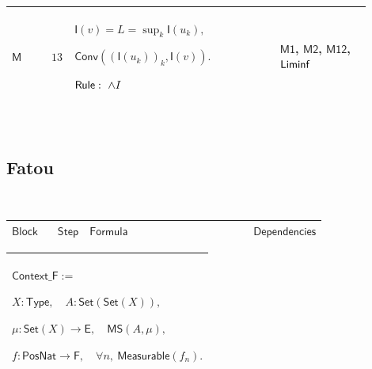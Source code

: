 \documentclass[12pt,reqno]{amsart}
\theoremstyle{blueplain}
\numberwithin{equation}{section}
\newlength{\FATOUOneColumnBody}
\begin{document}
{\scriptsize \setlength{\parskip}{0pt}\nointerlineskip
\noindent 
\begin{tabular}{|@{}>{\centering\arraybackslash}m{0.10658\linewidth}|>{\centering\arraybackslash}m{0.03553\linewidth}|>{\centering\arraybackslash}m{0.52105\linewidth}|>{\centering\arraybackslash}m{0.23684\linewidth}|}
\hline
\hypertarget{proof:M13}{$\displaystyle \mathsf{M}$} & $\displaystyle 13$ & $%
\displaystyle \mathsf{I}(v)=L=\sup_k\mathsf{I}(u_k),$\par$\displaystyle 
\mathsf{Conv}((\mathsf{I}(u_k))_k,\mathsf{I}(v)).$\par$\displaystyle \mathsf{%
Rule}:\ \land I$ & \hyperlink{proof:M1}{$\displaystyle \mathsf{M1}$}, 
\hyperlink{proof:M2}{$\displaystyle \mathsf{M2}$}, \hyperlink{proof:M12}{$%
\displaystyle \mathsf{M12}$}, \hyperlink{lem:Liminf}{$\displaystyle \mathsf{%
Liminf}$} \\ \hline
\end{tabular}%
}

{\scriptsize \ }

\subsection{\protect\scriptsize Fatou}

{\scriptsize {\ }}

{\scriptsize \setlength{\parskip}{0pt}\nointerlineskip
\noindent 
\begin{tabular}{|@{}>{\centering\arraybackslash}m{\FATOUOneColumnBody}|}
\hline
$\displaystyle \mathsf{FatouProof}$ \\ \hline
\end{tabular}%
}

{\scriptsize \setlength{\parskip}{0pt}\nointerlineskip
\noindent 
\begin{tabular}{|@{}>{\centering\arraybackslash}m{0.10658\linewidth}|>{\centering\arraybackslash}m{0.03553\linewidth}|>{\centering\arraybackslash}m{0.52105\linewidth}|>{\centering\arraybackslash}m{0.23684\linewidth}|}
\hline
$\displaystyle \mathsf{Block}$ & $\displaystyle \mathsf{Step}$ & $%
\displaystyle \mathsf{Formula}$ & $\displaystyle \mathsf{Dependencies}$ \\ 
\hline
\end{tabular}%
}

{\scriptsize \setlength{\parskip}{0pt}\nointerlineskip
\noindent 
\begin{tabular}{|@{}>{\centering\arraybackslash}m{\FATOUOneColumnBody}|}
\hline
$\displaystyle \mathsf{Context\_F}:=$\par$\displaystyle X:\mathsf{Type}%
,\quad A:\mathsf{Set}(\mathsf{Set}(X)),$\par$\displaystyle \mu:\mathsf{Set}%
(X)\to\mathsf{E},\quad\mathsf{MS}(A,\mu),$\par$\displaystyle f:\mathsf{PosNat%
}\to\mathsf{F},\quad\forall n,\ \mathsf{Measurable}(f_n).$ \\ \hline
\end{tabular}%
}
\end{document}
